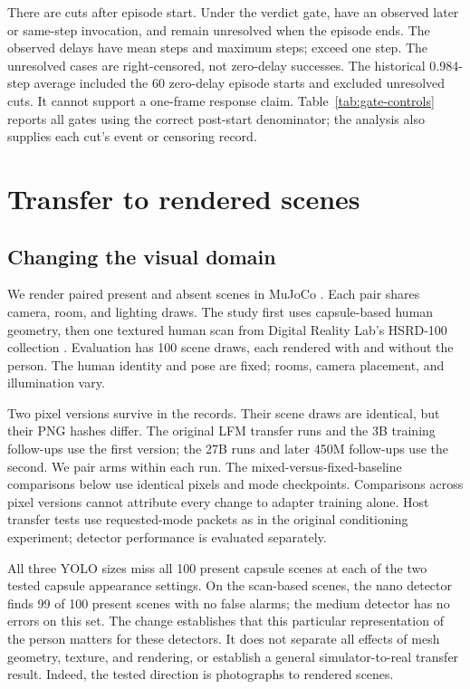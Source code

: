 \documentclass[10pt]{article}
\begin{document}
There are \PostCuts{} cuts after episode start. Under the verdict
gate, \ResolvedCuts{} have an observed later or same-step invocation,
and \CensoredCuts{} remain unresolved when the episode ends.
The observed delays have mean \ResolvedDelay{} steps and maximum
\MaxDelay{} steps; \SlowCuts{} exceed one step. The unresolved
cases are right-censored, not zero-delay successes. The historical
0.984-step average included the 60 zero-delay episode starts and
excluded unresolved cuts. It cannot support a one-frame response
claim. Table~\ref{tab:gate-controls} reports all gates using the
correct post-start denominator; the analysis also supplies each
cut's event or censoring record.

\section{Transfer to rendered scenes}
\subsection{Changing the visual domain}
We render paired present and absent scenes in MuJoCo
\citep{mujoco}. Each pair shares camera, room, and lighting draws.
The study first uses capsule-based human geometry, then one
textured human scan from Digital Reality Lab's HSRD-100 collection
\citep{hsrd}. Evaluation has 100 scene draws, each rendered with
and without the person. The human identity and pose are fixed;
rooms, camera placement, and illumination vary.

Two pixel versions survive in the records. Their scene draws are
identical, but their PNG hashes differ. The original LFM transfer
runs and the 3B training follow-ups use the first version; the 27B
runs and later 450M follow-ups use the second. We pair arms within
each run. The mixed-versus-fixed-baseline comparisons below use
identical pixels and mode checkpoints. Comparisons across pixel
versions cannot attribute every change to adapter training alone.
Host transfer tests use requested-mode packets as in the original
conditioning experiment; detector performance is evaluated separately.

All three YOLO sizes miss all 100 present capsule scenes at each
of the two tested capsule appearance settings. On the scan-based
scenes, the nano detector finds 99 of 100 present scenes with no
false alarms; the medium detector has no errors on this set.
The change establishes that this particular representation of the
person matters for these detectors. It does not separate all
effects of mesh geometry, texture, and rendering, or establish a
general simulator-to-real transfer result. Indeed, the tested
direction is photographs to rendered scenes.
\end{document}
